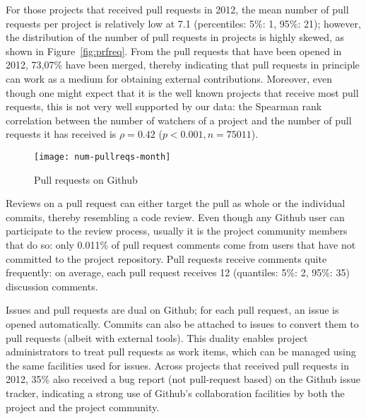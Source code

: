 \documentclass{sig-alternate}
\begin{document}
For those projects that received pull requests in 2012, the mean number of pull
requests per project is relatively low at 7.1 (percentiles: 5\%: 1, 95\%: 21);
however, the distribution of the number of pull requests in projects is highly skewed, as
shown in Figure~\ref{fig:prfreq}.
From the pull requests that have been opened in 2012, 73,07\% have been merged,
thereby indicating that pull requests in principle can work as a medium for
obtaining external contributions. Moreover, even though one might expect that it
is the well known projects that receive most pull requests, this is not very
well supported by our data: the Spearman rank correlation between the number of
watchers of a project and the number of pull requests it has received is $\rho = 0.42$ ($p < 0.001, n = 75011$).

\begin{figure}[t]
  \centering
\texttt{[image: num-pullreqs-month]}
\label{fig:pullreq-per-month}
\caption{Pull requests on Github}
\end{figure}


Reviews on a pull request can either target the pull as whole or the individual commits,
thereby resembling a code review. 
Even though any Github user can participate to the
review process, usually it is the project community members that do so:
only 0.011\% of pull request comments come from users that have not
committed to the project repository.
Pull requests receive comments quite frequently: on average, each pull
request receives 12 (quantiles: 5\%: 2, 95\%: 35) discussion comments.

Issues and pull requests are dual on Github; for each pull request, an issue is
opened automatically. Commits can also be attached to issues to convert them to
pull requests (albeit with external tools). This duality enables project
administrators to treat pull requests as work items, which can be managed using
the same facilities used for issues. Across projects that received pull
requests in 2012, 35\% also received a bug report (not pull-request based) 
on the Github issue tracker, indicating a strong use of Github's collaboration
facilities by both the project and the project community.
\end{document}
